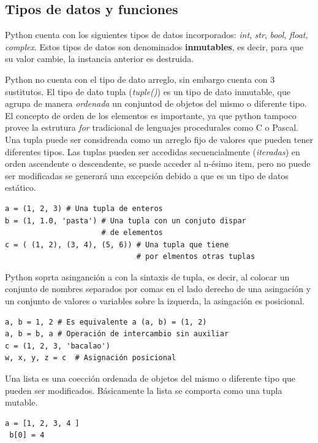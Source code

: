 \documentclass[a4paper]{report}
\begin{document}
\subsection{Tipos de datos y funciones}
Python cuenta con los siguientes tipos de datos incorporados: 
\emph{int}, 
\emph{str}, 
\emph{bool}, 
\emph{float}, 
\emph{complex}. Estos
tipos de datos son denominados \textbf{inmutables}, es decir, para que su valor
cambie, la instancia anterior
es destruida. 

Python no cuenta con el tipo de dato arreglo, sin embargo cuenta con 3
sustitutos. 
El tipo de dato tupla (\emph{tuple()}) es un tipo de dato inmutable, que agrupa 
de manera \emph{ordenada} un conjuntod de objetos del mismo o diferente
tipo. El concepto de orden de los elementos es importante, ya que python tampoco
provee la estrutura \emph{for} tradicional
de lenguajes procedurales como C o Pascal. %
Una tupla puede ser considreada como un arreglo fijo de valores que pueden
tener diferentes tipos. Las tuplas pueden ser accedidas secuencialmente
(\emph{iteradas}) en orden ascendente o descendente, se puede 
acceder al n-ésimo item, pero no puede ser modificadas se generará una excepción
debido 
a que es un tipo de datos estático.
\begin{lstlisting}[style=python]
a = (1, 2, 3) # Una tupla de enteros
b = (1, 1.0, 'pasta') # Una tupla con un conjuto dispar 
                      # de elementos
c = ( (1, 2), (3, 4), (5, 6)) # Una tupla que tiene 
                              # por elmentos otras tuplas
\end{lstlisting}

Python soprta asinganción a con la sintaxis de tupla, es decir, al colocar un
conjunto de nombres 
separados por comas en el lado derecho de una asingación y un conjunto de
valores o variables
sobre la izquerda, la asingación es posicional.
\begin{lstlisting}[style=python,label=asignacion-python,caption=Asignacion en
Python]
a, b = 1, 2	# Es equivalente a (a, b) = (1, 2)
a, b = b, a	# Operación de intercambio sin auxiliar
c = (1, 2, 3, 'bacalao')
w, x, y, z = c	# Asignación posicional
\end{lstlisting}

Una lista es una coección ordenada de objetos del mismo o diferente tipo que
pueden 
ser modificados. Básicamente la lista se comporta como una tupla mutable.
\begin{lstlisting}[style=python]
 a = [1, 2, 3, 4 ]
 b[0] = 4
\end{lstlisting}
\end{document}
